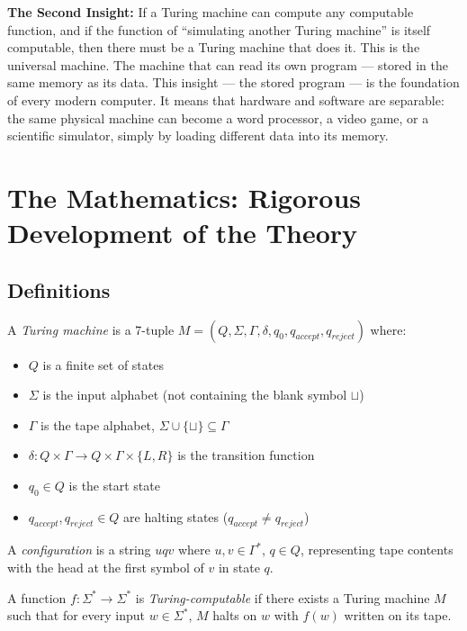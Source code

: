 \textbf{The Second Insight:} If a Turing machine can compute any computable function, and if the function of ``simulating another Turing machine'' is itself computable, then there must be a Turing machine that does it. This is the universal machine. The machine that can read its own program --- stored in the same memory as its data.
This insight --- the stored program --- is the foundation of every modern computer. It means that hardware and software are separable: the same physical machine can become a word processor, a video game, or a scientific simulator, simply by loading different data into its memory.

\section{The Mathematics: Rigorous Development of the Theory}
\label{sec:computation:math}

\subsection{Definitions}
\label{sec:computation:definitions}

\begin{definition}
A \emph{Turing machine} is a 7-tuple $M = (Q, \Sigma, \Gamma, \delta, q_0, q_{accept}, q_{reject})$ where:
\begin{itemize}
\item $Q$ is a finite set of states
\item $\Sigma$ is the input alphabet (not containing the blank symbol $\sqcup$)
\item $\Gamma$ is the tape alphabet, $\Sigma \cup \{\sqcup\} \subseteq \Gamma$
\item $\delta: Q \times \Gamma \to Q \times \Gamma \times \{L, R\}$ is the transition function
\item $q_0 \in Q$ is the start state
\item $q_{accept}, q_{reject} \in Q$ are halting states ($q_{accept} \neq q_{reject}$)
\end{itemize}
A \emph{configuration} is a string $uqv$ where $u,v \in \Gamma^*$, $q \in Q$, representing tape contents with the head at the first symbol of $v$ in state $q$.
\end{definition}

\begin{definition}
A function $f: \Sigma^* \to \Sigma^*$ is \emph{Turing-computable} if there exists a Turing machine $M$ such that for every input $w \in \Sigma^*$, $M$ halts on $w$ with $f(w)$ written on its tape.
\end{definition}

